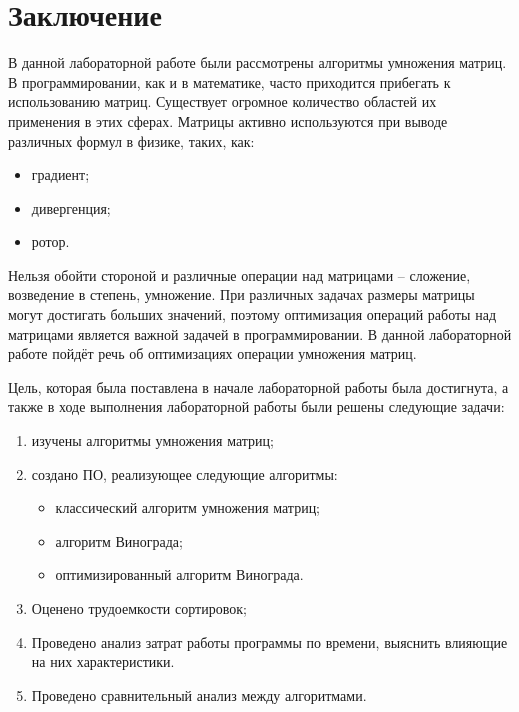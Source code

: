 \chapter*{Заключение}

В данной лабораторной работе были рассмотрены алгоритмы умножения матриц. В программировании, как и в математике, часто приходится прибегать к использованию матриц. Существует огромное количество областей их применения в этих сферах. Матрицы активно используются при выводе различных формул в физике, таких, как:
\begin{itemize}
	\item градиент;
	\item дивергенция;
	\item ротор.
\end{itemize}

Нельзя обойти стороной и различные операции над матрицами – сложение, возведение в степень, умножение. При различных задачах размеры матрицы могут достигать больших значений, поэтому оптимизация операций работы над матрицами является важной задачей в программировании. В данной лабораторной работе пойдёт речь об оптимизациях операции умножения матриц.

Цель, которая была поставлена в начале лабораторной работы была достигнута, а также в ходе выполнения лабораторной работы были решены следующие задачи:
\begin{enumerate}[label={\arabic*)}]
	\item изучены алгоритмы умножения матриц;
	\item создано ПО, реализующее следующие алгоритмы:
	\begin{itemize}
		\item классический алгоритм умножения матриц;
		\item алгоритм Винограда;
		\item оптимизированный алгоритм Винограда.
	\end{itemize}
	\item Оценено трудоемкости сортировок;
	\item Проведено анализ затрат работы программы по времени, выяснить влияющие на них характеристики.
	\item Проведено сравнительный анализ между алгоритмами.
\end{enumerate}